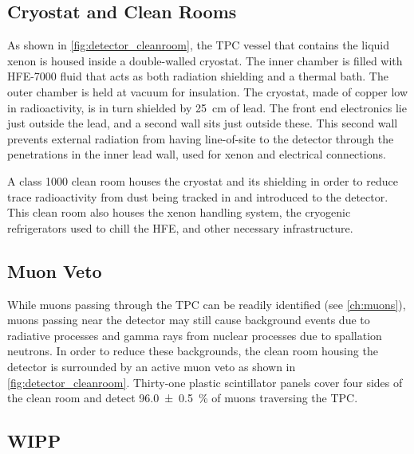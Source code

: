 \documentclass[herrin-thesis.tex]{subfiles}
\begin{document}
\subsection{Cryostat and Clean Rooms}
As shown in \cref{fig:detector_cleanroom}, the TPC vessel that contains the liquid xenon is housed inside a double-walled cryostat. The inner chamber is filled with HFE-7000 fluid that acts as both radiation shielding and a thermal bath. The outer chamber is held at vacuum for insulation. The cryostat, made of copper low in radioactivity, is in turn shielded by \SI{25}{\cm} of lead. The front end electronics lie just outside the lead, and a second wall sits just outside these. This second wall prevents external radiation from having line-of-site to the detector through the penetrations in the inner lead wall, used for xenon and electrical connections.

A class 1000 clean room houses the cryostat and its shielding in order to reduce trace radioactivity from dust being tracked in and introduced to the detector. This clean room also houses the xenon handling system, the cryogenic refrigerators used to chill the HFE, and other necessary infrastructure.

\subsection{Muon Veto}
While muons passing through the TPC can be readily identified (see \cref{ch:muons}), muons passing near the detector may still cause background events due to radiative processes and gamma rays from nuclear processes due to spallation neutrons. In order to reduce these backgrounds, the clean room housing the detector is surrounded by an active muon veto as shown in \cref{fig:detector_cleanroom}. Thirty-one plastic scintillator panels cover four sides of the clean room and detect \SI{96.0\pm0.5}{\%} of muons traversing the TPC.

\subsection{WIPP}
\end{document}
